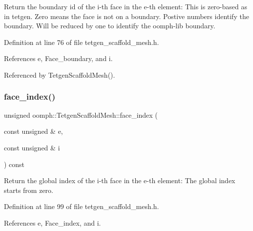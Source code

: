 Return the boundary id of the i-\/th face in the e-\/th element\+: This is zero-\/based as in tetgen. Zero means the face is not on a boundary. Postive numbers identify the boundary. Will be reduced by one to identify the oomph-\/lib boundary. 



Definition at line 76 of file tetgen\+\_\+scaffold\+\_\+mesh.\+h.



References e, Face\+\_\+boundary, and i.



Referenced by Tetgen\+Scaffold\+Mesh().

\mbox{\label{classoomph_1_1TetgenScaffoldMesh_af6d0653e21dc39c3731c53f94f6bf7ef}} 
\subsubsection{\texorpdfstring{face\+\_\+index()}{face\_index()}}
{\footnotesize\ttfamily unsigned oomph\+::\+Tetgen\+Scaffold\+Mesh\+::face\+\_\+index (\begin{DoxyParamCaption}\item[{const unsigned \&}]{e,  }\item[{const unsigned \&}]{i }\end{DoxyParamCaption}) const\hspace{0.3cm}{\ttfamily [inline]}}



Return the global index of the i-\/th face in the e-\/th element\+: The global index starts from zero. 



Definition at line 99 of file tetgen\+\_\+scaffold\+\_\+mesh.\+h.



References e, Face\+\_\+index, and i.

\mbox{\label{classoomph_1_1TetgenScaffoldMesh_aa608b06d59df775fa51924d1c68e9d2b}} 
